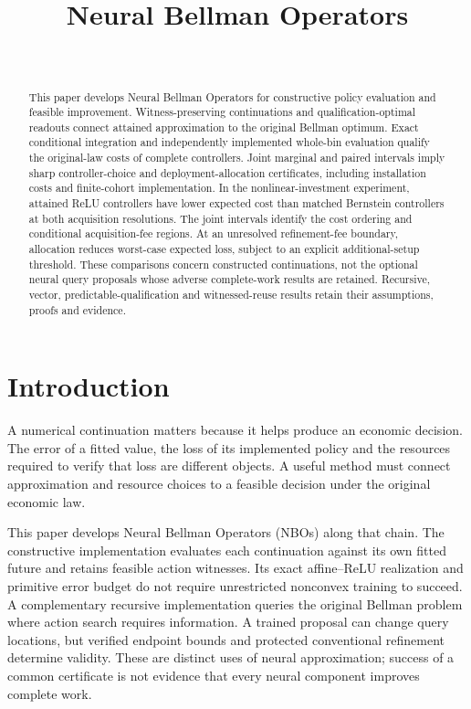 \documentclass[ecta,nameyear,draft]{econsocart}
\begin{document}
\begin{frontmatter}
\title{Neural Bellman Operators}
\begin{aug}
\author[id=au1,addressref={add1}]{~}
\address[id=add1]{Peking University}
\end{aug}
\begin{abstract}
This paper develops Neural Bellman Operators for constructive policy evaluation and feasible improvement. Witness-preserving continuations and qualification-optimal readouts connect attained approximation to the original Bellman optimum. Exact conditional integration and independently implemented whole-bin evaluation qualify the original-law costs of complete controllers. Joint marginal and paired intervals imply sharp controller-choice and deployment-allocation certificates, including installation costs and finite-cohort implementation. In the nonlinear-investment experiment, attained ReLU controllers have lower expected cost than matched Bernstein controllers at both acquisition resolutions. The joint intervals identify the cost ordering and conditional acquisition-fee regions. At an unresolved refinement-fee boundary, allocation reduces worst-case expected loss, subject to an explicit additional-setup threshold. These comparisons concern constructed continuations, not the optional neural query proposals whose adverse complete-work results are retained. Recursive, vector, predictable-qualification and witnessed-reuse results retain their assumptions, proofs and evidence.
\end{abstract}
\begin{keyword}
\end{keyword}
\end{frontmatter}
\section{Introduction}\label{sec:introduction65}
A numerical continuation matters because it helps produce an economic decision. The error of a fitted value, the loss of its implemented policy and the resources required to verify that loss are different objects. A useful method must connect approximation and resource choices to a feasible decision under the original economic law.

This paper develops Neural Bellman Operators (NBOs) along that chain. The constructive implementation evaluates each continuation against its own fitted future and retains feasible action witnesses. Its exact affine--ReLU realization and primitive error budget do not require unrestricted nonconvex training to succeed. A complementary recursive implementation queries the original Bellman problem where action search requires information. A trained proposal can change query locations, but verified endpoint bounds and protected conventional refinement determine validity. These are distinct uses of neural approximation; success of a common certificate is not evidence that every neural component improves complete work.
\end{document}
